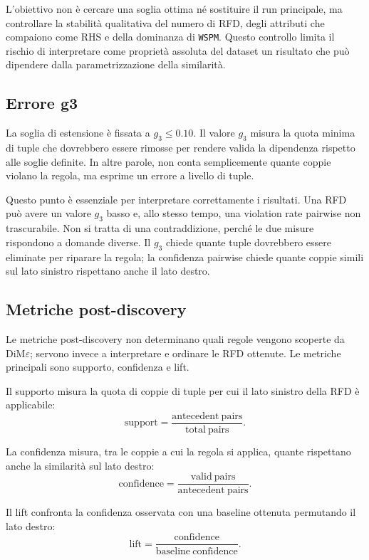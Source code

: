 \documentclass[a4paper,12pt]{article}
\newcommand{\Dime}{DiM\ensuremath{\varepsilon}}
\newcommand{\Wspm}{\texttt{WSPM}}
\begin{document}
L'obiettivo non è cercare una soglia ottima né sostituire il run principale, ma controllare la stabilità qualitativa del numero di RFD, degli attributi che compaiono come RHS e della dominanza di \Wspm. Questo controllo limita il rischio di interpretare come proprietà assoluta del dataset un risultato che può dipendere dalla parametrizzazione della similarità.

\subsection{Errore g3}

La soglia di estensione è fissata a $g_3 \leq 0.10$. Il valore $g_3$ misura la quota minima di tuple che dovrebbero essere rimosse per rendere valida la dipendenza rispetto alle soglie definite. In altre parole, non conta semplicemente quante coppie violano la regola, ma esprime un errore a livello di tuple.

Questo punto è essenziale per interpretare correttamente i risultati. Una RFD può avere un valore $g_3$ basso e, allo stesso tempo, una violation rate pairwise non trascurabile. Non si tratta di una contraddizione, perché le due misure rispondono a domande diverse. Il $g_3$ chiede quante tuple dovrebbero essere eliminate per riparare la regola; la confidenza pairwise chiede quante coppie simili sul lato sinistro rispettano anche il lato destro.

\subsection{Metriche post-discovery}

Le metriche post-discovery non determinano quali regole vengono scoperte da \Dime; servono invece a interpretare e ordinare le RFD ottenute. Le metriche principali sono supporto, confidenza e lift.

Il supporto misura la quota di coppie di tuple per cui il lato sinistro della RFD è applicabile:
\[
\mathrm{support} =
\frac{\mathrm{antecedent\ pairs}}{\mathrm{total\ pairs}}.
\]

La confidenza misura, tra le coppie a cui la regola si applica, quante rispettano anche la similarità sul lato destro:
\[
\mathrm{confidence} =
\frac{\mathrm{valid\ pairs}}{\mathrm{antecedent\ pairs}}.
\]

Il lift confronta la confidenza osservata con una baseline ottenuta permutando il lato destro:
\[
\mathrm{lift} =
\frac{\mathrm{confidence}}{\mathrm{baseline\ confidence}}.
\]
\end{document}
